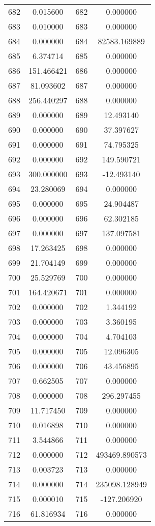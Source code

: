 \documentclass[12pt]{article}
\begin{document}
\begin{longtable}{@{}cccc@{}}
682 & 0.015600 & 682 & 0.000000 \\
683 & 0.010000 & 683 & 0.000000 \\
684 & 0.000000 & 684 & 82583.169889 \\
685 & 6.374714 & 685 & 0.000000 \\
686 & 151.466421 & 686 & 0.000000 \\
687 & 81.093602 & 687 & 0.000000 \\
688 & 256.440297 & 688 & 0.000000 \\
689 & 0.000000 & 689 & 12.493140 \\
690 & 0.000000 & 690 & 37.397627 \\
691 & 0.000000 & 691 & 74.795325 \\
692 & 0.000000 & 692 & 149.590721 \\
693 & 300.000000 & 693 & -12.493140 \\
694 & 23.280069 & 694 & 0.000000 \\
695 & 0.000000 & 695 & 24.904487 \\
696 & 0.000000 & 696 & 62.302185 \\
697 & 0.000000 & 697 & 137.097581 \\
698 & 17.263425 & 698 & 0.000000 \\
699 & 21.704149 & 699 & 0.000000 \\
700 & 25.529769 & 700 & 0.000000 \\
701 & 164.420671 & 701 & 0.000000 \\
702 & 0.000000 & 702 & 1.344192 \\
703 & 0.000000 & 703 & 3.360195 \\
704 & 0.000000 & 704 & 4.704103 \\
705 & 0.000000 & 705 & 12.096305 \\
706 & 0.000000 & 706 & 43.456895 \\
707 & 0.662505 & 707 & 0.000000 \\
708 & 0.000000 & 708 & 296.297455 \\
709 & 11.717450 & 709 & 0.000000 \\
710 & 0.016898 & 710 & 0.000000 \\
711 & 3.544866 & 711 & 0.000000 \\
712 & 0.000000 & 712 & 493469.890573 \\
713 & 0.003723 & 713 & 0.000000 \\
714 & 0.000000 & 714 & 235098.128949 \\
715 & 0.000010 & 715 & -127.206920 \\
716 & 61.816934 & 716 & 0.000000 \\

\end{longtable}
\end{document}
